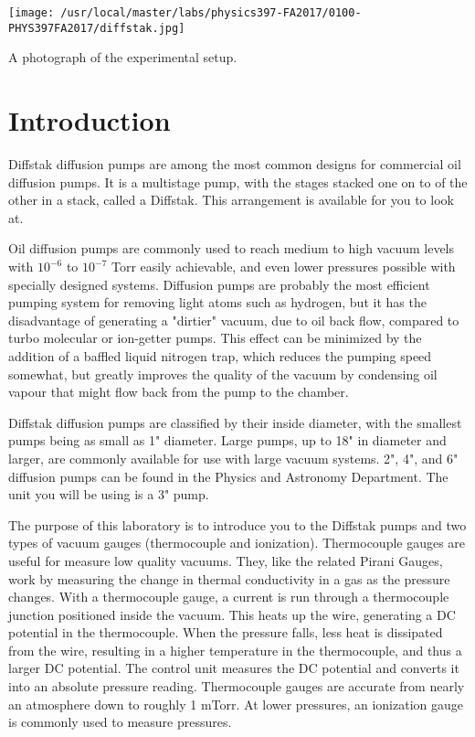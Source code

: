 \begin{marginfigure}
\texttt{[image: /usr/local/master/labs/physics397-FA2017/0100-PHYS397FA2017/diffstak.jpg]}
\caption{A photograph of the experimental setup.}
\label{fig:VACsetup7}
\end{marginfigure}

\section{Introduction}

Diffstak diffusion pumps are among the most common designs for commercial oil diffusion pumps. It is a multistage pump, with the stages stacked one on to of the other in a stack, called a Diffstak. This arrangement is available for you to look at.

Oil diffusion pumps are commonly used to reach medium to high vacuum levels with  $10^{-6}$ to $10^{-7}$ Torr easily achievable, and even lower pressures possible with specially designed systems. Diffusion pumps are probably the most efficient pumping system for removing light atoms such as hydrogen, but it has the disadvantage of generating a "dirtier" vacuum, due to oil back flow, compared to turbo molecular or ion-getter pumps. This effect can be minimized by the addition of a baffled liquid nitrogen trap, which reduces the pumping speed somewhat, but greatly improves the quality of the vacuum by condensing oil vapour that might flow back from the pump to the chamber.

Diffstak diffusion pumps are classified by their inside diameter, with the smallest pumps being as small as 1" diameter. Large pumps, up to 18" in diameter and larger, are commonly available for use with large vacuum systems.  2", 4", and 6" diffusion pumps can be found in the Physics and Astronomy Department. The unit you will be using is a 3" pump.

The purpose of this laboratory is to introduce you to the Diffstak pumps and two types of vacuum gauges (thermocouple and ionization). Thermocouple gauges are useful for measure low quality vacuums. They, like the related Pirani Gauges, work by measuring the change in thermal conductivity in a gas as the pressure changes. With a thermocouple gauge, a current is run through a thermocouple junction positioned inside the vacuum. This heats up the wire, generating a DC potential in the thermocouple. When the pressure falls, less heat is dissipated from the wire, resulting in a higher temperature in the thermocouple, and thus a larger DC potential. The control unit measures the DC potential and converts it into an absolute pressure reading. Thermocouple gauges are accurate from nearly an atmosphere down to roughly 1 mTorr. At lower pressures, an ionization gauge is commonly used to measure pressures.

